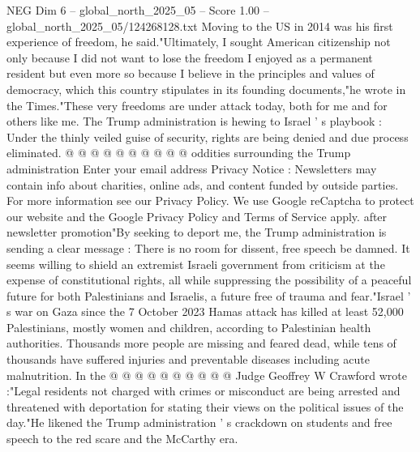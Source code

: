 \begin{textsample}{NEG Dim 6 – global\_north\_2025\_05 – Score 1.00 – global\_north\_2025\_05/124268128.txt}
Moving to the US in 2014 was his first experience of freedom, he said."Ultimately, I sought American citizenship not only because I did not want to lose the freedom I enjoyed as a permanent resident but even more so because I believe in the principles and values of democracy, which this country stipulates in its founding documents,"he wrote in the Times."These very freedoms are under attack today, both for me and for others like me.
The Trump administration is hewing to Israel ' s playbook : Under the thinly veiled guise of security, rights are being denied and due process eliminated. @ @ @ @ @ @ @ @ @ @ oddities surrounding the Trump administration Enter your email address Privacy Notice : Newsletters may contain info about charities, online ads, and content funded by outside parties.
For more information see our Privacy Policy.
We use Google reCaptcha to protect our website and the Google Privacy Policy and Terms of Service apply. after newsletter promotion"By seeking to deport me, the Trump administration is sending a clear message : There is no room for dissent, free speech be damned.
It seems willing to shield an extremist Israeli government from criticism at the expense of constitutional rights, all while suppressing the possibility of a peaceful future for both Palestinians and Israelis, a future free of trauma and fear."Israel ' s war on Gaza since the 7 October 2023 Hamas attack has killed at least 52,000 Palestinians, mostly women and children, according to Palestinian health authorities.
Thousands more people are missing and feared dead, while tens of thousands have suffered injuries and preventable diseases including acute malnutrition.
In the @ @ @ @ @ @ @ @ @ @ Judge Geoffrey W Crawford wrote :"Legal residents not charged with crimes or misconduct are being arrested and threatened with deportation for stating their views on the political issues of the day."He likened the Trump administration ' s crackdown on students and free speech to the red scare and the McCarthy era.

\end{textsample}
